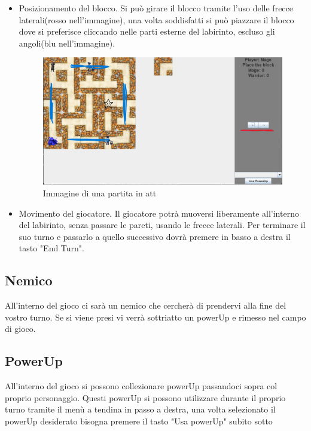 \documentclass[a4paper,12pt]{report}
\begin{document}
\begin{itemize}
 \item Posizionamento del blocco. Si può girare il blocco tramite l'uso delle frecce laterali(rosso nell'immagine), una volta soddisfatti si può piazzare il blocco dove si preferisce cliccando nelle parti esterne del labirinto, escluso gli angoli(blu nell'immagine).
 \begin{figure}[H]
	\includegraphics[width=\textwidth]{img/EsempioDiPrimoTurno.png}
	\caption{Immagine di una partita in att}
	\label{img:Esempio di primo turno}
 \end{figure}
 \item Movimento del giocatore. Il giocatore potrà muoversi liberamente all'interno del labirinto, senza passare le pareti, usando le frecce laterali. Per terminare il suo turno e passarlo a quello successivo dovrà premere in basso a destra il tasto "End Turn".
\end{itemize}

\subsection*{Nemico}

All'interno del gioco ci sarà un nemico che cercherà di prendervi alla fine del vostro turno. Se si viene presi vi verrà sottriatto un powerUp e rimesso nel campo di gioco.

\subsection*{PowerUp}

All'interno del gioco si possono collezionare powerUp passandoci sopra col proprio personaggio. Questi powerUp si possono utilizzare durante il 
proprio turno tramite il menù a tendina in passo a destra, una volta selezionato il powerUp desiderato bisogna premere il tasto "Usa powerUp" subito sotto
\end{document}
